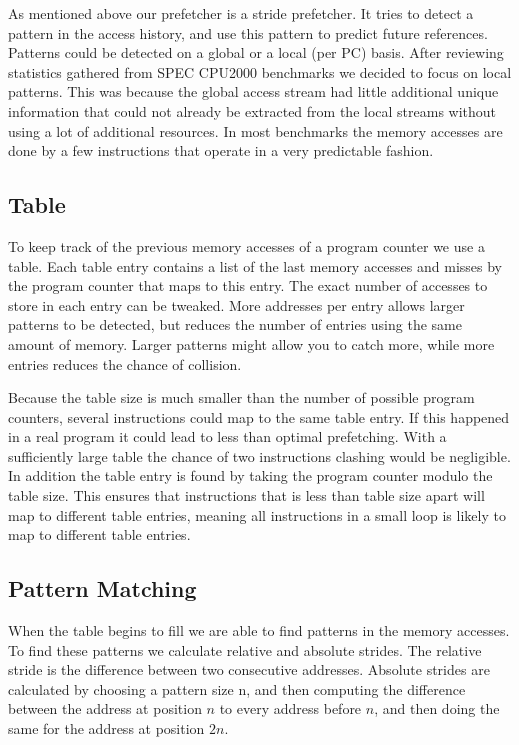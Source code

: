 As mentioned above our prefetcher is a stride prefetcher. It tries to detect a 
pattern in the access history, and use this pattern to predict future 
references. Patterns could be detected on a global or a local (per PC) basis.
After reviewing statistics gathered from SPEC CPU2000 benchmarks we decided to 
focus on local patterns. This was because the global access stream had little 
additional unique information that could not already be extracted from the 
local streams without using a lot of additional resources. In most benchmarks 
the memory accesses are done by a few instructions that operate in a very 
predictable fashion.

\subsection{Table}

To keep track of the previous memory accesses of a program counter we use a
table. Each table entry contains a list of the last memory accesses
and misses by the program counter that maps to this entry.
The exact number of accesses to store in each entry can be tweaked.
More addresses per entry allows larger patterns to be detected,
but reduces the number of entries using the same amount of memory.
Larger patterns might allow you to catch more, while more entries
reduces the chance of collision.

Because the table size is much smaller
than the number of possible program counters, several instructions could map to
the same table entry. If this happened in a real program it could lead to less
than optimal prefetching. With a sufficiently large table the chance of two
instructions clashing would be negligible. In addition the table entry is found
by taking the program counter modulo the table size. This ensures that
instructions that is less than table size apart will map to different table
entries, meaning all instructions in a small loop is likely to map to different
table entries.

\subsection{Pattern Matching}

When the table begins to fill we are able to find patterns in the memory accesses.
To find these patterns we calculate relative and absolute strides.
The relative stride is the difference between two consecutive
addresses. Absolute strides are calculated by choosing a pattern size n,
and then computing the difference between the address at position
$n$ to every address before $n$, and then doing the same for the address
at position $2n$.

